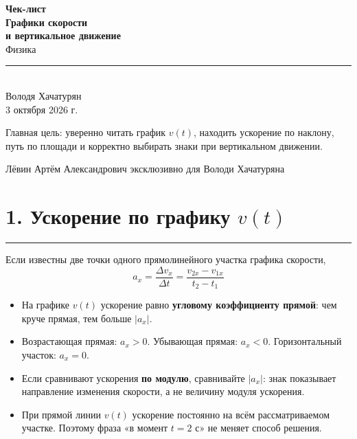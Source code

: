 \documentclass[a4paper,12pt]{article}
\newcommand{\sectionrule}{\par\vspace{0.25em}\noindent\color{accent}\rule{\linewidth}{0.55pt}\color{textgray}\par\vspace{0.25em}}
\newcommand{\key}[1]{\textbf{\color{darkaccent}#1}}
\newcommand{\formula}[1]{\[\boxed{#1}\]}
\begin{document}
\thispagestyle{empty}
\begin{center}
\vspace*{22mm}
{\Large\color{darkaccent}\textbf{Чек-лист}}\\[7mm]
{\Huge\bfseries Графики скорости\\[2mm] и вертикальное движение}\\[9mm]
{\large Физика}\\[15mm]
\color{accent}\rule{0.62\linewidth}{0.8pt}\\[12mm]
{\Large Володя Хачатурян}\\[5mm]
{\large 3 октября 2026 г.}\\[24mm]
\begin{minipage}{0.78\linewidth}
\centering
\large
Главная цель: уверенно читать график $v(t)$, находить ускорение по наклону, путь по площади и корректно выбирать знаки при вертикальном движении.
\end{minipage}
\end{center}

\vfill
\begin{center}
{\small\color{darkaccent}Лёвин Артём Александрович эксклюзивно для Володи Хачатуряна}
\end{center}
\vspace{4mm}
\clearpage

\section*{1. Ускорение по графику $v(t)$}
\sectionrule

Если известны две точки одного прямолинейного участка графика скорости,
\formula{a_x=\frac{\Delta v_x}{\Delta t}=\frac{v_{2x}-v_{1x}}{t_2-t_1}}

\begin{itemize}
  \item На графике $v(t)$ ускорение равно \key{угловому коэффициенту прямой}: чем круче прямая, тем больше $|a_x|$.
  \item Возрастающая прямая: $a_x>0$. Убывающая прямая: $a_x<0$. Горизонтальный участок: $a_x=0$.
  \item Если сравнивают ускорения \key{по модулю}, сравнивайте $|a_x|$: знак показывает направление изменения скорости, а не величину модуля ускорения.
  \item При прямой линии $v(t)$ ускорение постоянно на всём рассматриваемом участке. Поэтому фраза «в момент $t=2$ с» не меняет способ решения.
\end{itemize}
\end{document}
